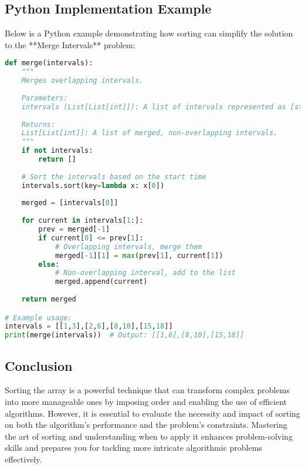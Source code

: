 \subsection*{Python Implementation Example}
Below is a Python example demonstrating how sorting can simplify the solution to the **Merge Intervals** problem:

\begin{fullwidth}
\begin{lstlisting}[language=Python]
def merge(intervals):
    """
    Merges overlapping intervals.
    
    Parameters:
    intervals (List[List[int]]): A list of intervals represented as [start, end].
    
    Returns:
    List[List[int]]: A list of merged, non-overlapping intervals.
    """
    if not intervals:
        return []
    
    # Sort the intervals based on the start time
    intervals.sort(key=lambda x: x[0])
    
    merged = [intervals[0]]
    
    for current in intervals[1:]:
        prev = merged[-1]
        if current[0] <= prev[1]:
            # Overlapping intervals, merge them
            merged[-1][1] = max(prev[1], current[1])
        else:
            # Non-overlapping interval, add to the list
            merged.append(current)
    
    return merged

# Example usage:
intervals = [[1,3],[2,6],[8,10],[15,18]]
print(merge(intervals))  # Output: [[1,6],[8,10],[15,18]]
\end{lstlisting}
\end{fullwidth}

\subsection*{Conclusion}
Sorting the array is a powerful technique that can transform complex problems into more manageable ones by imposing order and enabling the use of efficient algorithms. However, it is essential to evaluate the necessity and impact of sorting on both the algorithm's performance and the problem's constraints. Mastering the art of sorting and understanding when to apply it enhances problem-solving skills and prepares you for tackling more intricate algorithmic problems effectively.